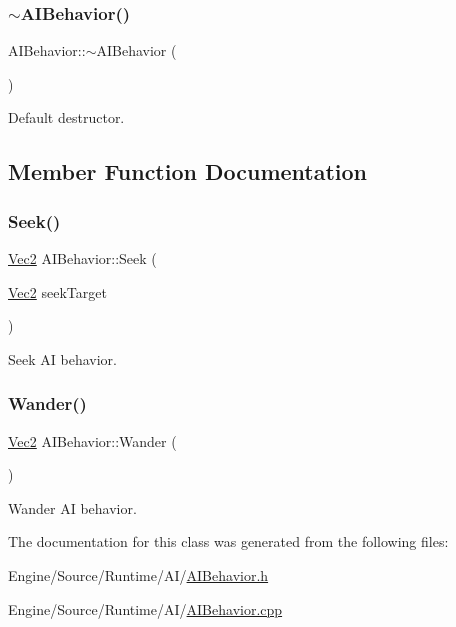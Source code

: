 \subsubsection{\texorpdfstring{$\sim$\+A\+I\+Behavior()}{~AIBehavior()}}
{\footnotesize\ttfamily A\+I\+Behavior\+::$\sim$\+A\+I\+Behavior (\begin{DoxyParamCaption}{ }\end{DoxyParamCaption})}

Default destructor. 

\subsection{Member Function Documentation}
\mbox{\label{class_a_i_behavior_aff36069dc016db7b3c174347e79063c2}} 
\subsubsection{\texorpdfstring{Seek()}{Seek()}}
{\footnotesize\ttfamily \mbox{\hyperlink{struct_vec2}{Vec2}} A\+I\+Behavior\+::\+Seek (\begin{DoxyParamCaption}\item[{\mbox{\hyperlink{struct_vec2}{Vec2}}}]{seek\+Target }\end{DoxyParamCaption})}

Seek AI behavior. \mbox{\label{class_a_i_behavior_a8f2b2c143732f4a23af75c7abbe01978}} 
\subsubsection{\texorpdfstring{Wander()}{Wander()}}
{\footnotesize\ttfamily \mbox{\hyperlink{struct_vec2}{Vec2}} A\+I\+Behavior\+::\+Wander (\begin{DoxyParamCaption}{ }\end{DoxyParamCaption})}

Wander AI behavior. 

The documentation for this class was generated from the following files\+:\begin{DoxyCompactItemize}
\item 
Engine/\+Source/\+Runtime/\+A\+I/\mbox{\hyperlink{_a_i_behavior_8h}{A\+I\+Behavior.\+h}}\item 
Engine/\+Source/\+Runtime/\+A\+I/\mbox{\hyperlink{_a_i_behavior_8cpp}{A\+I\+Behavior.\+cpp}}\end{DoxyCompactItemize}
